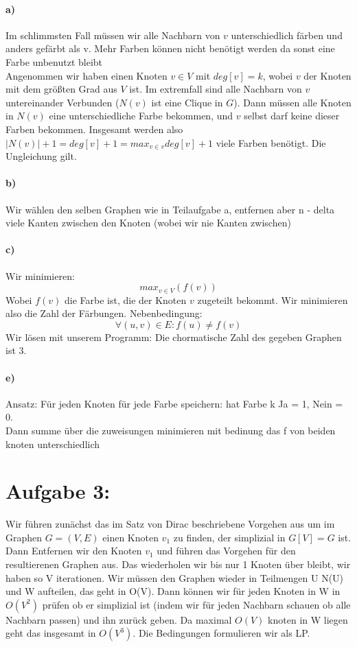 \documentclass[a4paper]{article}
\begin{document}
\paragraph*{a)}
Im schlimmsten Fall müssen wir alle Nachbarn von $v$ unterschiedlich färben und
anders gefärbt als v. Mehr Farben können nicht benötigt werden da sonst eine 
Farbe unbenutzt bleibt \\
Angenommen wir haben einen Knoten $v \in V$ mit $deg[v] = k$, wobei $v$ der Knoten
mit dem größten Grad aus $V$ ist. Im extremfall sind alle Nachbarn von $v$ untereinander
Verbunden ($N(v)$ ist eine Clique in $G$). Dann müssen alle Knoten in $N(v)$ eine 
unterschiedliche Farbe bekommen, und $v$ selbst darf keine dieser Farben bekommen.
Insgesamt werden also $|N(v)| + 1 = deg[v] + 1 = max_{v \in v} deg[v] + 1$ viele 
Farben benötigt. Die Ungleichung gilt.
\paragraph*{b)}
Wir wählen den selben Graphen wie in Teilaufgabe a, entfernen aber n - delta viele
Kanten zwischen den Knoten (wobei wir nie Kanten zwischen)
\paragraph*{c)}
Wir minimieren: 
\[
    max_{v \in V}(f(v))
\]
Wobei $f(v)$ die Farbe ist, die der Knoten $v$ zugeteilt bekommt. Wir minimieren also
die Zahl der Färbungen. Nebenbedingung:
\[
    \forall (u, v) \in E: f(u) \neq f(v)  
\] 
Wir lösen mit unserem Programm: Die chormatische Zahl des gegeben Graphen ist 3.
\paragraph*{e)}
Ansatz: Für jeden Knoten für jede Farbe speichern: hat Farbe k Ja = 1, Nein = 0. \\
Dann summe über die zuweisungen minimieren mit bedinung das f von beiden knoten
unterschiedlich
\section*{Aufgabe 3:}
Wir führen zunächst das im Satz von Dirac beschriebene Vorgehen aus um im Graphen
$G = (V, E)$ einen Knoten $v_1$ zu finden, der simplizial in $G[V] = G$ ist. \\
Dann Entfernen wir den Knoten $v_1$ und führen das Vorgehen für den resultierenen
Graphen aus. Das wiederholen wir bis nur 1 Knoten über bleibt, wir haben so V
iterationen. Wir müssen den Graphen wieder in Teilmengen U N(U) und W aufteilen,
das geht in O(V). Dann können wir für jeden Knoten in W in $O(V^2)$ prüfen ob 
er simplizial ist (indem wir für jeden Nachbarn schauen ob alle Nachbarn passen) 
und ihn zurück geben. Da maximal $O(V)$ knoten in W liegen
geht das insgesamt in $O(V^3)$. Die Bedingungen formulieren wir als LP. 
\end{document}
